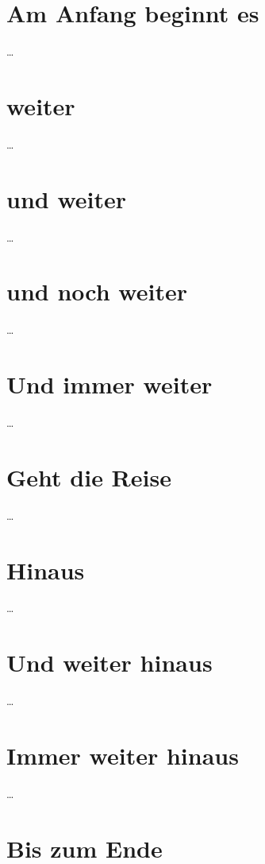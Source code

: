 \documentclass{scrbook}
\begin{document}
\chapter{Am Anfang beginnt es}\dots
\chapter{weiter}\dots
\chapter{und weiter}\dots
\chapter{und noch weiter}\dots
\chapter{Und immer weiter}\dots
\chapter{Geht die Reise}\dots
\chapter{Hinaus}\dots
\chapter{Und weiter hinaus}\dots
\chapter{Immer weiter hinaus}\dots
\chapter{Bis zum Ende}
\end{document}
